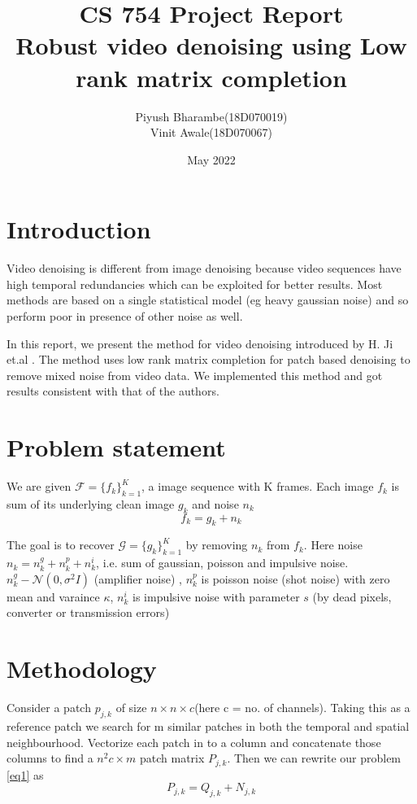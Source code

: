 \documentclass{article}
\title{CS 754 Project Report  \\ Robust video denoising using Low rank matrix completion}
\author{Piyush Bharambe(18D070019) \\
Vinit Awale(18D070067)}
\date{May 2022}
\begin{document}
\maketitle

\section{Introduction}
Video denoising is different from image denoising because video sequences have high temporal redundancies which can be exploited for better results. Most methods are based on a single statistical model (eg heavy gaussian noise) and so perform poor in presence of other noise as well.

In this report, we present the method for video denoising introduced by H. Ji et.al \cite{H Ji}. The method uses low rank matrix completion for patch based denoising to remove mixed noise from video data.
We implemented this method and got results consistent with that of the authors.  

\section{Problem statement}
We are given $\mathcal{F} = \{f_k\}_{k=1}^K$, a image sequence with K frames. Each image $f_k$ is sum of its underlying clean image $g_k$ and noise $n_k$
\begin{equation*}\label{eq1}
    f_k = g_k + n_k
\end{equation*}

The goal is to recover $\mathcal{G} = \{g_k\}_{k=1}^K$ by removing $n_k$ from $f_k$. Here noise $n_k = n_k^g+ n_k^p +n_k^i$, i.e. sum of gaussian, poisson and impulsive noise. $n_k^g - \mathcal{N}(0, \sigma^2 I)$ (amplifier noise) , $n_k^p$ is poisson noise (shot noise) with zero mean and varaince $\kappa$, $n_k^i$ is impulsive noise with parameter $s$ (by dead pixels, converter or transmission errors)

\section{Methodology}
Consider a patch $p_{j,k}$ of size $n \times n \times c$(here c = no. of channels). Taking this as a reference patch we search for m similar patches in both the temporal and spatial neighbourhood.  Vectorize each patch in to a column and concatenate those columns to find a $n^2c \times m$ patch matrix $P_{j,k}$. Then we can rewrite our problem \ref{eq1} as 
\begin{equation*}
    P_{j,k} = Q_{j,k}+N_{j,k}
\end{equation*}
\end{document}
